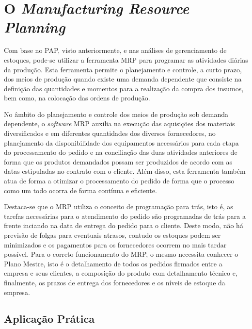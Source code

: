 \chapter{O \textit{Manufacturing Resource Planning}}
\label{chap:manufacturing_resource_planning}

Com base no \ac{PAP}, visto anteriormente, e nas análises de gerenciamento de estoques, pode-se utilizar a ferramenta \ac{MRP} para programar as atividades diárias da produção. Esta ferramenta permite o planejamento e controle, a curto prazo, dos meios de produção quando existe uma demanda dependente que consiste na definição das quantidades e momentos para a realização da compra dos insumos, bem como, na colocação das ordens de produção.

No âmbito do planejamento e controle dos meios de produção sob demanda dependente, o \textit{software} \ac{MRP} auxilia na execução das aquisições dos materiais diversificados e em diferentes quantidades dos diversos fornecedores, no planejamento da disponibilidade dos equipamentos necessários para cada etapa do processamento do pedido e na conciliação das duas atividades anteriores de forma que os produtos demandados possam ser produzidos de acordo com as datas estipuladas no contrato com o cliente. Além disso, esta ferramenta também atua de forma a otimizar o processamento do pedido de forma que o processo como um todo ocorra de forma contínua e eficiente.

Destaca-se que o \ac{MRP} utiliza o conceito de programação para trás, isto é, as tarefas necessárias para o atendimento do pedido são programadas de trás para a frente inciando na data de entrega do pedido para o cliente. Deste modo, não há previsão de folgas para eventuais atrasos, contudo os estoques podem ser minimizados e os pagamentos para os fornecedores ocorrem no mais tardar possível. Para o correto funcionamento do \ac{MRP}, o mesmo necessita conhecer o Plano Mestre, isto é o detalhamento de todos os pedidos firmados entre a empresa e seus clientes, a composição do produto com detalhamento técnico e, finalmente, os prazos de entrega dos fornecedores e os níveis de estoque da empresa.


\section{Aplicação Prática}
\label{sec:manufacturing_resource_planning_aplicacao}
